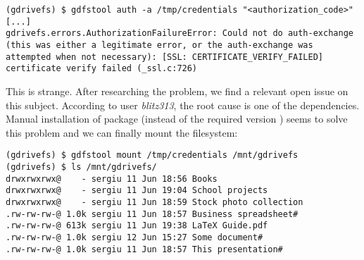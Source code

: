 \begin{lstlisting}[caption=GDriveFS authentication error]
(gdrivefs) $ gdfstool auth -a /tmp/credentials "<authorization_code>"
[...]
gdrivefs.errors.AuthorizationFailureError: Could not do auth-exchange (this was either a legitimate error, or the auth-exchange was attempted when not necessary): [SSL: CERTIFICATE_VERIFY_FAILED] certificate verify failed (_ssl.c:726)
\end{lstlisting}

This is strange. After researching the problem, we find a relevant open issue on this subject\cite{gdrivefs_ssl_handshake_error}. According to user \emph{blitz313}, the root cause is one of the dependencies. Manual installation of package  (instead of the required version ) seems to solve this problem and we can finally mount the filesystem:

\begin{lstlisting}[caption=GDriveFS filesystem mount]
(gdrivefs) $ gdfstool mount /tmp/credentials /mnt/gdrivefs
(gdrivefs) $ ls /mnt/gdrivefs/
drwxrwxrwx@    - sergiu 11 Jun 18:56 Books
drwxrwxrwx@    - sergiu 11 Jun 19:04 School projects
drwxrwxrwx@    - sergiu 11 Jun 18:59 Stock photo collection
.rw-rw-rw-@ 1.0k sergiu 11 Jun 18:57 Business spreadsheet#
.rw-rw-rw-@ 613k sergiu 11 Jun 19:38 LaTeX Guide.pdf
.rw-rw-rw-@ 1.0k sergiu 12 Jun 15:27 Some document#
.rw-rw-rw-@ 1.0k sergiu 11 Jun 18:57 This presentation#
\end{lstlisting}

